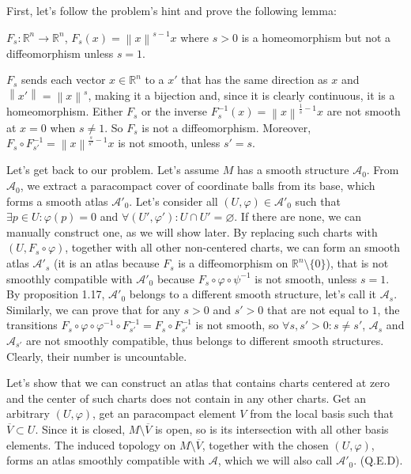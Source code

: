 \documentclass[a4paper]{article}
\begin{document}
\begin{exercise}[1-6]
    First, let's follow the problem's hint and prove the following lemma:
    \begin{lemma}
        $F_s \colon \mathbb{R}^n \to \mathbb{R}^n$,
        $F_s(x) = \left\| x \right\|^{s-1} x$ where $s>0$ is a homeomorphism but not a diffeomorphism
        unless $s=1$.
    \end{lemma}
    \begin{prf}
        $F_s$ sends each vector $x \in \mathbb{R}^n$ to a $x'$ that has
        the same direction as $x$ and $\left\| x' \right\| = \left\| x \right\|^s$, making
        it a bijection and, since it is clearly continuous, it is a homeomorphism.
        Either $F_s$ or the inverse $F_s^{-1} (x) = \left\| x \right\|^{\frac{1}{s} - 1} x$
        are not smooth at $x=0$ when $s \ne 1$. So $F_s$ is not a diffeomorphism.
        Moreover, $F_s \circ F_{s'}^{-1} = \left\| x \right\|^{\frac{s}{s'} - 1} x$ is not smooth, 
        unless $s' = s$.
    \end{prf}

    Let's get back to our problem. Let's assume $M$ has a smooth structure $\mathcal{A}_0$.
    From $\mathcal{A}_0$, we extract a paracompact cover of coordinate balls from its base,
    which forms a smooth atlas $\mathcal{A}'_0$. Let's consider all $(U, \varphi) \in \mathcal{A}'_0$
    such that $\exists p \in U \colon \varphi(p) = 0$ and $\forall (U', \varphi') \colon U\cap U' = \varnothing$.
    If there are none, we can manually construct one, as we will show later.
    By replacing such charts with $(U, F_s \circ \varphi)$, together with all
    other non-centered charts, we can form an smooth atlas $\mathcal{A}'_s$
    (it is an atlas because $F_s$ is a diffeomorphism on $\mathbb{R}^n \setminus \{0\}$),
    that is not smoothly compatible with $\mathcal{A}'_0$ because $F_s \circ \varphi \circ \psi^{-1} $ is not smooth, unless $s=1$.
    By proposition 1.17, $\mathcal{A}'_0$ belongs to a different smooth structure,
    let's call it $\mathcal{A}_s$. Similarly, we can prove that for any $s>0$ and $s'>0$
    that are not equal to $1$, the transitions $F_s \circ \varphi \circ \varphi^{-1} \circ F_{s'}^{-1} = F_s \circ F_{s'}^{-1} $
    is not smooth, so $\forall s,s'>0 \colon s \ne s'$, $\mathcal{A}_s$ and
    $\mathcal{A}_{s'}$ are not smoothly compatible, thus belongs to different
    smooth structures. Clearly, their number is uncountable.

    Let's show that we can construct an atlas that contains charts centered at
    zero and the center of such charts does not contain in any other charts.
    Get an arbitrary $(U, \varphi)$,
    get an paracompact element $V$ from the local basis such that $\overline{V} \subset U$.
    Since it is closed, $M \setminus \overline{V}$ is open, so is its intersection
    with all other basis elements. The induced topology on $M \setminus \overline{V}$,
    together with the chosen $(U, \varphi)$, forms an atlas smoothly compatible
    with $\mathcal{A}$, which we will also call $\mathcal{A}'_0$. (Q.E.D).
\end{exercise}
\end{document}
